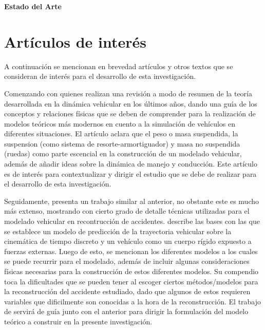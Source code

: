 \setcounter{section}{0}
\begin{singlespace}

\huge{\textbf{Estado del Arte}}

\normalsize
\section{Artículos de interés}

\hspace{1 cm}A continuación se mencionan en brevedad artículos y otros textos que se consideran de interés para el desarrollo de esta investigación.

\hspace{1 cm} Comenzando con \citet{Yang} quienes realizan una revisión a modo de resumen de la teoría desarrollada en la dinámica vehicular en los últimos años, dando una guía de los conceptos y relaciones físicas que se deben de comprender para la realización de modelos teóricos más modernos en cuento a la simulación de vehículos en diferentes situaciones. El artículo aclara que el peso o masa suspendida, la suspension (como sistema de resorte-armortiguador) y masa no suspendida (ruedas) como parte escencial en la construcción de un modelado vehicular,  además de añadir ideas sobre la dinámica de manejo y conducción. Este artículo es de interés para contextualizar y dirigir el estudio que se debe de realizar para el desarrollo de esta investigación.

\hspace{1 cm} Seguidamente, \citet{Steffan2009} presenta un trabajo similar al anterior, no obstante este es mucho más extenso, mostrando con cierto grado de detalle técnicas utilizadas para el modelado vehicular en recontrucción de accidentes. \citet{Steffan2009} describe las bases con las que se establece un modelo de predicción de la trayectoria vehicular sobre la cinemática de tiempo discreto y un vehículo como un cuerpo rígido expuesto a fuerzas externas. Luego de esto, se mencionan los diferentes modelos a los cuales se puede recurrir para el modelado, además de incluir algunas consideraciones físicas necesarias para la construcción  de estos diferentes modelos.  Su compendio toca la dificultades que se pueden tener al escoger ciertos métodos/modelos para la reconstrucción del accidente estudiado, dado que algunos de estos requieren variables que dificilmente son conocidas a la hora de la reconstrucción. El trabajo de \citet{Steffan2009} servirá de guía junto con el anterior para dirigir la formulación del modelo teórico a construir en la presente investigación.


\end{singlespace}
